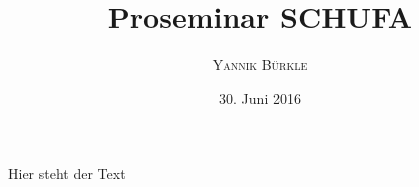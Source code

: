 \documentclass[12pt,titlepage]{article}
\begin{document}
\setcounter{page}{1}

\begin{titlepage}
\title{Proseminar SCHUFA}
\author{\textsc{Yannik Bürkle}}
\date{30. Juni 2016}
\end{titlepage}

\maketitle

\tableofcontents
\newpage
\setcounter{page}{1}

Hier steht der Text
\end{document}
